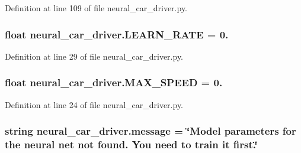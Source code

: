 Definition at line 109 of file neural\+\_\+car\+\_\+driver.\+py.

\subsubsection[{\texorpdfstring{L\+E\+A\+R\+N\+\_\+\+R\+A\+TE}{LEARN_RATE}}]{\setlength{\rightskip}{0pt plus 5cm}float neural\+\_\+car\+\_\+driver.\+L\+E\+A\+R\+N\+\_\+\+R\+A\+TE = 0.}\hypertarget{namespaceneural__car__driver_a3873d214234a7685f0003bdedb09a3b5}{}\label{namespaceneural__car__driver_a3873d214234a7685f0003bdedb09a3b5}


Definition at line 29 of file neural\+\_\+car\+\_\+driver.\+py.

\subsubsection[{\texorpdfstring{M\+A\+X\+\_\+\+S\+P\+E\+ED}{MAX_SPEED}}]{\setlength{\rightskip}{0pt plus 5cm}float neural\+\_\+car\+\_\+driver.\+M\+A\+X\+\_\+\+S\+P\+E\+ED = 0.}\hypertarget{namespaceneural__car__driver_af2fef2c19127bf0b4e990d28542c7b6f}{}\label{namespaceneural__car__driver_af2fef2c19127bf0b4e990d28542c7b6f}


Definition at line 24 of file neural\+\_\+car\+\_\+driver.\+py.

\subsubsection[{\texorpdfstring{message}{message}}]{\setlength{\rightskip}{0pt plus 5cm}string neural\+\_\+car\+\_\+driver.\+message = \char`\"{}Model parameters for the neural net not found. You need to train it first.\char`\"{}}\hypertarget{namespaceneural__car__driver_a65829420a3ca6888c41c04e36ad0c4fb}{}\label{namespaceneural__car__driver_a65829420a3ca6888c41c04e36ad0c4fb}



